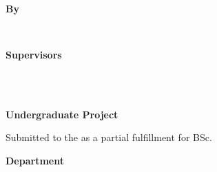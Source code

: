 \begin{center}
    \begin{large}
        \textbf{\MakeUppercase{\ttitle}} \\[1em]
    \end{large}
    \begin{Large}
        \textbf{By} \\
    \end{Large}
    \begin{large}
        \textbf{\tstudents} \\[1em]
    \end{large}
    \begin{Large}
        \textbf{Supervisors} \\[1em]
    \end{Large}
    \begin{large}
        \parbox{\textwidth}{\centering\textbf{\tsupervisors}} \\~\\
    \end{large}
    \begin{Large}
        \textbf{Undergraduate Project} \\
    \end{Large}
    Submitted to the \textbf{\tinstitution} \space \tuniversity \space as a partial fulfillment for BSc.\\
    \begin{Large}
        \textbf{\tdepartment \space Department} \\
    \end{Large}
    \begin{Large}
        \textbf{\tmonthAndYearSubmitted}
    \end{Large}
\end{center}

\vspace*{\fill}
